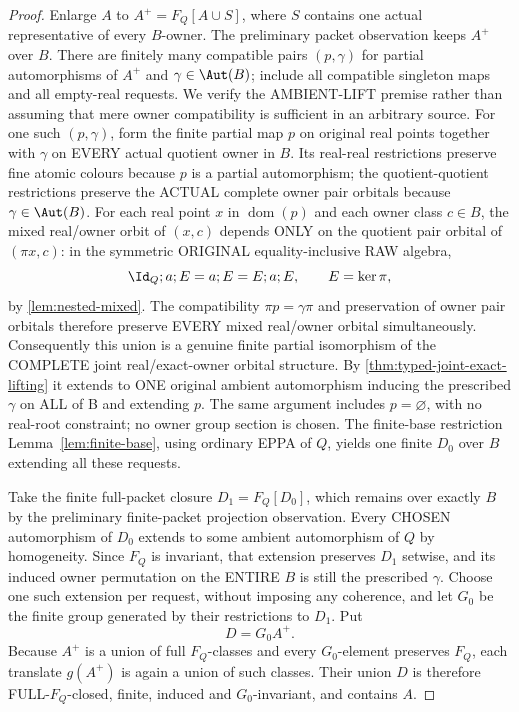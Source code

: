 \begin{proof}
Enlarge \(A\) to \(A^+=F_Q[A\cup S]\),
where \(S\) contains one actual representative
of every \(B\)-owner.  The preliminary
packet observation keeps \(A^+\) over \(B\).
There are finitely many compatible pairs
\((p,\gamma)\) for partial automorphisms
of \(A^+\) and \(\gamma\in\Aut(B)\);
include all compatible singleton maps and
all empty-real requests. We verify the
AMBIENT-LIFT premise rather than
assuming that mere owner compatibility
is sufficient in an arbitrary source.
For one such $(p,\gamma)$, form the
finite partial map $p$ on original
real points together with $\gamma$
on EVERY actual quotient owner in
$B$. Its real-real restrictions
preserve fine atomic colours
because $p$ is a partial
automorphism; the quotient-quotient
restrictions preserve the ACTUAL
complete owner pair orbitals
because $\gamma\in\Aut(B)$.
For each real point $x$ in
$\operatorname{dom}(p)$ and each
owner class $c\in B$, the mixed
real/owner orbit of $(x,c)$
depends ONLY on the quotient
pair orbital of $(\pi x,c)$:
in the symmetric ORIGINAL
equality-inclusive RAW algebra,
\[
       \Id_Q;a;E
           =a;E=E;a;E,
       \qquad E=\ker\pi,
\]
by \cref{lem:nested-mixed}.
The compatibility
$\pi p=\gamma\pi$ and
preservation of owner pair
orbitals therefore preserve
EVERY mixed real/owner
orbital simultaneously.
Consequently this union is
a genuine finite partial
isomorphism of the COMPLETE
joint real/exact-owner
orbital structure. By
\cref{thm:typed-joint-exact-lifting}
it extends to ONE original
ambient automorphism inducing
the prescribed $\gamma$ on
ALL of B and extending $p$.
The same argument includes
$p=\varnothing$, with no
real-root constraint; no
owner group section is chosen.
The finite-base restriction
Lemma~\ref{lem:finite-base}, using ordinary
EPPA of \(Q\), yields one finite \(D_0\)
over \(B\) extending all these requests.

Take the finite full-packet closure
\(D_1=F_Q[D_0]\), which remains over
exactly \(B\) by the preliminary
finite-packet projection observation.
Every CHOSEN automorphism of \(D_0\)
extends to some ambient automorphism
of \(Q\) by homogeneity. Since \(F_Q\)
is invariant, that extension preserves
\(D_1\) setwise, and its induced owner
permutation on the ENTIRE \(B\) is still
the prescribed \(\gamma\).
Choose one such extension per request,
without imposing any coherence, and let
\(G_0\) be the finite group generated by
their restrictions to \(D_1\). Put
\[
                         D=G_0 A^+.
\]
Because \(A^+\) is a union of full
\(F_Q\)-classes and every \(G_0\)-element
preserves \(F_Q\), each translate
\(g(A^+)\) is again a union of such
classes. Their union \(D\) is therefore
FULL-\(F_Q\)-closed, finite, induced
and \(G_0\)-invariant, and contains \(A\).


\end{proof}
